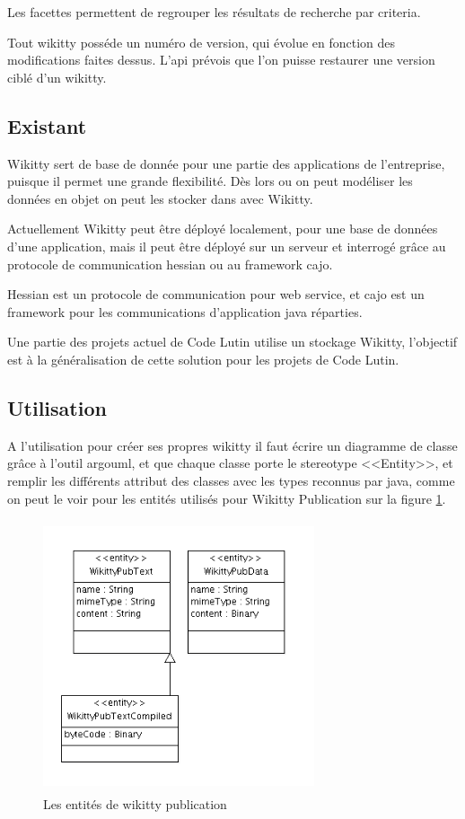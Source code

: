 Les facettes permettent de regrouper les résultats de recherche par criteria. 

Tout wikitty posséde un numéro de version, qui évolue en fonction des
modifications faites dessus. L'api prévois que l'on puisse restaurer une version
ciblé d'un wikitty.

\subsection{Existant}

Wikitty sert de base de donnée pour une partie des applications de l'entreprise,
puisque il permet une grande flexibilité. Dès lors ou on peut modéliser les
données en objet on peut les stocker dans avec Wikitty.

Actuellement Wikitty peut être déployé localement, pour une base de données
d'une application, mais il peut être déployé sur un serveur et interrogé grâce
au protocole de communication hessian ou au framework cajo.

Hessian est un protocole de communication pour web service, et cajo est un
framework pour les communications d'application java réparties. 

Une partie des projets actuel de Code Lutin utilise un stockage Wikitty, 
l'objectif est à la généralisation de cette solution pour les projets de 
Code Lutin.

\subsection{Utilisation}

A l'utilisation pour créer ses propres wikitty il faut écrire un diagramme de
classe grâce à l'outil argouml, et que chaque classe porte le stereotype
<<Entity>>, et remplir les différents attribut des classes avec les types
reconnus par java, comme on peut le voir pour les entités utilisés pour Wikitty
Publication sur la figure \ref{umlwikittypub}. 

\begin{figure}[!ht]
\centering
\includegraphics[height=8cm,width=8cm]{image/wikittypubuml.png}
  		\caption{Les entités de wikitty publication}
  		\label{umlwikittypub}
\end{figure}

